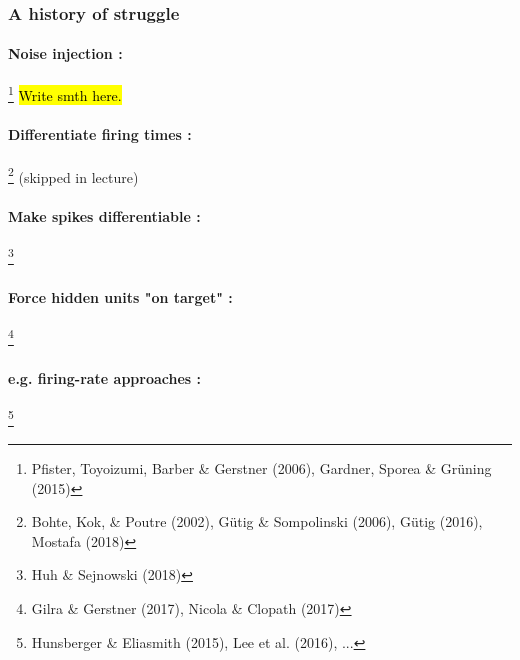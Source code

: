 \documentclass[main]{subfiles}
\begin{document}
\subsubsection{A history of struggle}

\paragraph{Noise injection :}\footnote{Pfister, Toyoizumi, Barber \& Gerstner (2006), Gardner, Sporea & Grüning (2015)} \hl{Write smth here.}

\paragraph{Differentiate firing times :}\footnote{Bohte, Kok, & Poutre (2002), Gütig \& Sompolinski (2006), Gütig (2016), Mostafa (2018)} (skipped in lecture)

\paragraph{Make spikes differentiable :}\footnote{Huh \& Sejnowski (2018)}

\paragraph{Force hidden units "on target" :}\footnote{Gilra \& Gerstner (2017), Nicola & Clopath (2017)}

\paragraph{e.g. firing-rate approaches :}\footnote{Hunsberger \& Eliasmith (2015), Lee et al. (2016), ...}

\newpage
\end{document}

